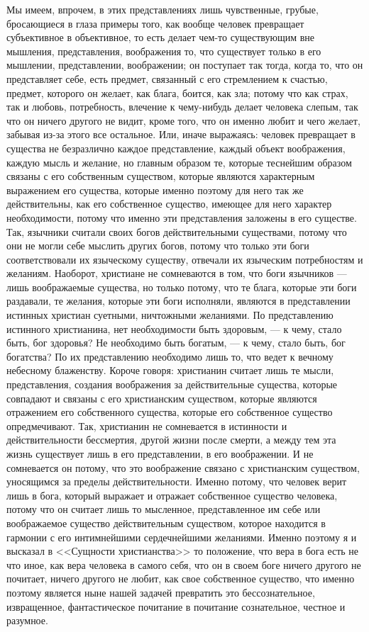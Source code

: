 \documentclass[12pt]{article}
\begin{document}
Мы имеем, впрочем, в этих представлениях лишь чувственные, грубые, бросающиеся в глаза примеры того, как вообще человек превращает субъективное в объективное, то есть делает чем-то существующим вне мышления, представления, воображения то, что существует только в его мышлении, представлении, воображении; он поступает так тогда, когда то, что он представляет себе, есть предмет, связанный с его стремлением к счастью, предмет, которого он желает, как блага, боится, как зла; потому что как страх, так и любовь, потребность, влечение к чему-нибудь делает человека слепым, так что он ничего другого не видит, кроме того, что он именно любит и чего желает, забывая из-за этого все остальное. Или, иначе выражаясь: человек превращает в существа не безразлично каждое представление, каждый объект воображения, каждую мысль и желание, но главным образом те, которые теснейшим образом связаны с его собственным существом, которые являются характерным выражением его существа, которые именно поэтому для него так же действительны, как его собственное существо, имеющее для него характер необходимости, потому что именно эти представления заложены в его существе. Так, язычники считали своих богов действительными существами, потому что они не могли себе мыслить других богов, потому что только эти боги соответствовали их языческому существу, отвечали их языческим потребностям и желаниям. Наоборот, христиане не сомневаются в том, что боги язычников --- лишь воображаемые существа, но только потому, что те блага, которые эти боги раздавали, те желания, которые эти боги исполняли, являются в представлении истинных христиан суетными, ничтожными желаниями. По представлению истинного христианина, нет необходимости быть здоровым, --- к чему, стало быть, бог здоровья? Не необходимо быть богатым, --- к чему, стало быть, бог богатства? По их представлению необходимо лишь то, что ведет к вечному небесному блаженству. Короче говоря: христианин считает лишь те мысли, представления, создания воображения за действительные существа, которые совпадают и связаны с его христианским существом, которые являются отражением его собственного существа, которые его собственное существо опредмечивают. Так, христианин не сомневается в истинности и действительности бессмертия, другой жизни после смерти, а между тем эта жизнь существует лишь в его представлении, в его воображении. И не сомневается он потому, что это воображение связано с христианским существом, уносящимся за пределы действительности. Именно потому, что человек верит лишь в бога, который выражает и отражает собственное существо человека, потому что он считает лишь то мысленное, представленное им себе или воображаемое существо действительным существом, которое находится в гармонии с его интимнейшими сердечнейшими желаниями. Именно поэтому я и высказал в <<Сущности христианства>> то положение, что вера в бога есть не что иное, как вера человека в самого себя, что он в своем боге ничего другого не почитает, ничего другого не любит, как свое собственное существо, что именно поэтому является ныне нашей задачей превратить это бессознательное, извращенное, фантастическое почитание в почитание сознательное, честное и разумное. 
\end{document}
